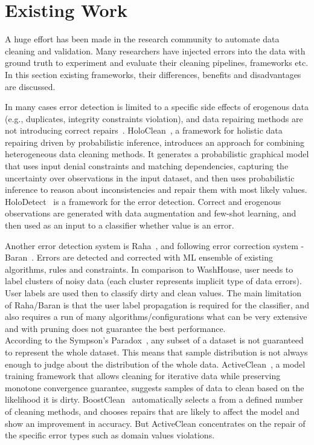 \section{Existing Work}
A huge effort has been made in the research community to automate data cleaning and validation. 
Many researchers have injected errors into the data with ground truth to experiment and evaluate their cleaning pipelines, frameworks etc.
In this section existing frameworks, their differences, benefits and disadvantages are discussed.

In many cases error detection is limited to a specific side effects of erogenous data (e.g., duplicates, integrity constraints violation), and data repairing methods are not introducing correct repairs~\cite{holoclean}. 
HoloClean~\cite{holoclean}, a framework for holistic data repairing driven by probabilistic inference, introduces an approach for combining heterogeneous data cleaning methods.
It generates a probabilistic graphical model that uses input denial constraints and matching dependencies, capturing the uncertainty over observations in the input dataset, and then uses probabilistic inference to reason about inconsistencies and repair them with most likely values. 
HoloDetect~\cite{holodetect} is a framework for the error detection. Correct and erogenous observations are generated with data augmentation and few-shot learning, and then used as an input to a classifier whether value is an error.

Another error detection system is Raha~\cite{raha}, and following error correction system - Baran~\cite{baran}. Errors are detected and corrected with ML ensemble of existing algorithms, rules and constraints.
In comparison to WashHouse, user needs to label clusters of noisy data (each cluster represents implicit type of data errors). User labels are used then to classify dirty and clean values. 
The main limitation of Raha/Baran is that the user label propagation is required for the classifier, and also requires a run of many algorithms/configurations what can be very extensive and with pruning does not guarantee the best performance.\\
According to the Sympson's Paradox~\cite{activeclean}, any subset of a dataset is not guaranteed to represent the whole dataset.
This means that sample distribution is not always enough to judge about the distribution of the whole data. 
ActiveClean~\cite{activeclean}, a model training framework that allows cleaning for iterative data while preserving monotone convergence guarantee, suggests samples of data to clean based on the likelihood it is dirty. 
BoostClean~\cite{boostclean} automatically selects a from a defined number of cleaning methods, and chooses repairs that are likely to affect the model and show an improvement in accuracy. 
But ActiveClean concentrates on the repair of the specific error types such as domain values violations.\\


